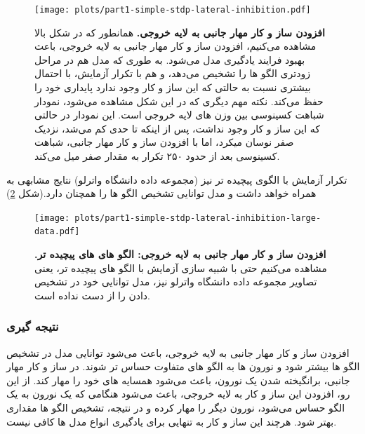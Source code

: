     \begin{figure}[!ht]
        \centering
        \texttt{[image: plots/part1-simple-stdp-lateral-inhibition.pdf]} 
        \captionsetup{width=.85\linewidth}
        \caption{\textbf{افزودن ساز و کار مهار جانبی به لایه خروجی. } 
        همانطور که در شکل بالا مشاهده می‌کنیم، افزودن ساز و کار مهار جانبی به لایه خروجی، باعث بهبود فرایند یادگیری مدل می‌شود. به طوری که مدل هم در مراحل زودتری الگو ها را تشخیص می‌دهد، و هم با تکرار آزمایش، با احتمال بیشتری نسبت به حالتی که این ساز و کار وجود ندارد پایداری خود را حفظ می‌کند. نکته مهم دیگری که در این شکل مشاهده می‌شود، نمودار شباهت کسینوسی بین وزن های لایه خروجی است. این نمودار در حالتی که این ساز و کار وجود نداشت، پس از اینکه تا حدی کم می‌شد، نزدیک صفر نوسان میکرد، اما با افزودن ساز و کار مهار جانبی، شباهت کسینوسی بعد از حدود ۲۵۰ تکرار به مقدار صفر میل می‌کند.
        }
        \label{fig:part1-simple-stdp-lateral-inhibition}
    \end{figure}

    تکرار آزمایش با الگوی پیچیده تر نیز 
    (مجموعه داده دانشگاه واترلو) 
    نتایج مشابهی به همراه خواهد داشت و مدل توانایی تشخیص الگو ها را همچنان دارد.(شکل \ref{fig:part1-simple-stdp-lateral-inhibition-large-data})

    \begin{figure}[!ht]
        \centering
        \texttt{[image: plots/part1-simple-stdp-lateral-inhibition-large-data.pdf]} 
        \captionsetup{width=.85\linewidth}
        \caption{\textbf{افزودن ساز و کار مهار جانبی به لایه خروجی: الگو های های پیچیده تر. } 
        مشاهده می‌کنیم حتی با شبیه سازی آزمایش با الگو های پیچیده تر، یعنی تصاویر مجموعه داده دانشگاه واترلو نیز، مدل توانایی خود در تشخیص دادن را از دست نداده است.
        }
        \label{fig:part1-simple-stdp-lateral-inhibition-large-data}
    \end{figure}

    \subsubsection*{نتیجه گیری}
        افزودن ساز و کار مهار جانبی به لایه خروجی، باعث می‌شود توانایی مدل در تشخیص الگو ها بیشتر شود و نورون ها به الگو های متفاوت حساس تر شوند. در ساز و کار مهار جانبی، برانگیخته شدن یک نورون، باعث می‌شود همسایه های خود را مهار کند. از این رو، افزودن این ساز و کار به لایه خروجی، باعث می‌شود هنگامی که یک نورون به یک الگو حساس می‌شود، نورون دیگر را مهار کرده و در نتیجه، تشخیص الگو ها مقداری بهتر شود. هرچند این ساز و کار به تنهایی برای یادگیری انواع مدل ها کافی نیست.

